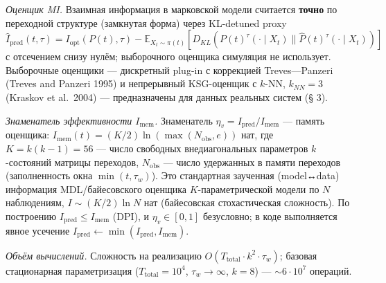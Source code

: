 \documentclass[pdflatex,sn-mathphys-ay]{sn-jnl}
\begin{document}
\emph{Оценщик MI.} Взаимная информация в марковской модели считается \textbf{точно} по переходной структуре (замкнутая форма) через KL-detuned proxy \(\widehat I_{\text{pred}}(t,\tau) = I_{\text{opt}}(P(t), \tau) - \mathbb{E}_{X_t \sim \pi(t)}[D_{KL}(P(t)^\tau(\cdot \mid X_t) \| \hat P(t)^\tau(\cdot \mid X_t))]\) с отсечением снизу нулём; выборочного оценщика симуляция не использует. Выборочные оценщики --- дискретный plug-in с коррекцией Treves---Panzeri (Treves and Panzeri 1995) и непрерывный KSG-оценщик с \(k\)-NN, \(k_{NN} = 3\) (Kraskov et al.~2004) --- предназначены для данных реальных систем (§ 3).



\emph{Знаменатель эффективности \(I_{\text{mem}}\).} Знаменатель \(\eta_v = I_{\text{pred}}/I_{\text{mem}}\) --- память оценщика: \(I_{\text{mem}}(t) = (K/2)\ln(\max(N_{\text{obs}}, e))\) нат, где \(K = k(k-1) = 56\) --- число свободных внедиагональных параметров \(k\)-состояний матрицы переходов, \(N_{\text{obs}}\) --- число удержанных в памяти переходов (заполненность окна \(\min(t, \tau_w)\)). Это стандартная заученная (model↔data) информация MDL/байесовского оценщика \(K\)-параметрической модели по \(N\) наблюдениям, \(I \sim (K/2)\ln N\) нат (байесовская стохастическая сложность). По построению \(I_{\text{pred}} \le I_{\text{mem}}\) (DPI), и \(\eta_v \in [0,1]\) безусловно; в коде выполняется явное усечение \(I_{\text{pred}} \gets \min(I_{\text{pred}}, I_{\text{mem}})\).



\emph{Объём вычислений.} Сложность на реализацию \(O(T_{\text{total}} \cdot k^2 \cdot \tau_w)\); базовая стационарная параметризация (\(T_{\text{total}} = 10^4\), \(\tau_w \to \infty\), \(k = 8\)) --- \(\sim 6 \cdot 10^7\) операций.
\end{document}

